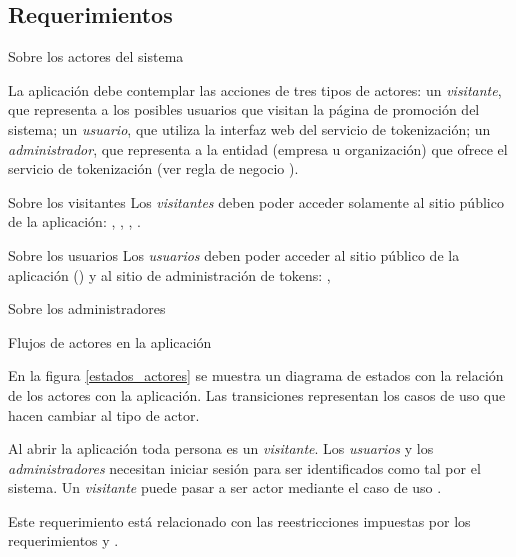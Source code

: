 %
%

\subsection{Requerimientos}


{Sobre los actores del sistema}
{
  La aplicación debe contemplar las acciones de tres tipos de actores: un
  \textit{visitante}, que representa a los posibles usuarios que visitan la
  página de promoción del sistema; un \textit{usuario}, que utiliza la interfaz
  web del servicio de tokenización; un \textit{administrador}, que representa a
  la entidad (empresa u organización) que ofrece el servicio de tokenización
  (ver regla de negocio ).

  {Sobre los visitantes}
  {
    Los \textit{visitantes} deben poder acceder solamente al sitio público de la
    aplicación: , ,
    , .
  }

  {Sobre los usuarios}
  {
    Los \textit{usuarios} deben poder acceder al sitio público de la aplicación
    () y al sitio de administración de tokens:
    , \textit{}
  }

  {Sobre los administradores}
  {

  }

  {Flujos de actores en la aplicación}
  {
    En la figura \ref{estados_actores} se muestra un diagrama de estados con
    la relación de los actores con la aplicación. Las transiciones representan
    los casos de uso que hacen cambiar al tipo de actor.

    Al abrir la aplicación toda persona es un \textit{visitante}. Los
    \textit{usuarios} y los \textit{administradores} necesitan iniciar sesión
    para ser identificados como tal por el sistema. Un \textit{visitante} puede
    pasar a ser actor mediante el caso de uso .

    Este requerimiento está relacionado con las reestricciones impuestas por los
    requerimientos  y
    .
  }
}

